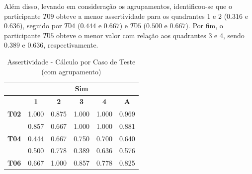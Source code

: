 Além disso, levando em consideração os agrupamentos, identificou-se que o participante $T09$ obteve a menor assertividade para os quadrantes 1 e 2 ($0.316$ e $0.636$), seguido por $T04$ ($0.444$ e $0.667$) e $T05$ ($0.500$ e $0.667$). Por fim, o participante $T05$ obteve o menor valor com relação aos quadrantes 3 e 4, sendo $0.389$ e $0.636$, respectivamente.

\begin{table}[htbp]
	\centering
	\caption{Assertividade - Cálculo por Caso de Teste (com agrupamento)}
	\begin{tabular}{|cccccc|}
		\hline
		\rowcolor[HTML]{D0CECE} 
		\multicolumn{1}{|c|}{\cellcolor[HTML]{F2F2F2}\textbf{Agrupamento}} & \multicolumn{5}{c|}{Sim} \\ \hline
		\rowcolor[HTML]{D0CECE} 
		\multicolumn{1}{|c|}{\cellcolor[HTML]{D0CECE}\textbf{Participante}} & \multicolumn{1}{c|}{\cellcolor[HTML]{D0CECE}\textbf{1}} & \multicolumn{1}{c|}{\cellcolor[HTML]{D0CECE}\textbf{2}} & \multicolumn{1}{c|}{\cellcolor[HTML]{D0CECE}\textbf{3}} & \multicolumn{1}{c|}{\cellcolor[HTML]{D0CECE}\textbf{4}} & \textbf{A} \\ \hline
		\multicolumn{1}{|c|}{\textbf{T02}} & \multicolumn{1}{c|}{1.000} & \multicolumn{1}{c|}{0.875} & \multicolumn{1}{c|}{1.000} & \multicolumn{1}{c|}{1.000} & 0.969 \\ \hline
		\rowcolor[HTML]{F2F2F2} 
		\multicolumn{1}{|c|}{\cellcolor[HTML]{F2F2F2}\textbf{T03}} & \multicolumn{1}{c|}{\cellcolor[HTML]{F2F2F2}0.857} & \multicolumn{1}{c|}{\cellcolor[HTML]{F2F2F2}0.667} & \multicolumn{1}{c|}{\cellcolor[HTML]{F2F2F2}1.000} & \multicolumn{1}{c|}{\cellcolor[HTML]{F2F2F2}1.000} & 0.881 \\ \hline
		\multicolumn{1}{|c|}{\textbf{T04}} & \multicolumn{1}{c|}{0.444} & \multicolumn{1}{c|}{0.667} & \multicolumn{1}{c|}{0.750} & \multicolumn{1}{c|}{0.700} & 0.640 \\ \hline
		\rowcolor[HTML]{F2F2F2} 
		\multicolumn{1}{|c|}{\cellcolor[HTML]{F2F2F2}\textbf{T05}} & \multicolumn{1}{c|}{\cellcolor[HTML]{F2F2F2}0.500} & \multicolumn{1}{c|}{\cellcolor[HTML]{F2F2F2}0.778} & \multicolumn{1}{c|}{\cellcolor[HTML]{F2F2F2}0.389} & \multicolumn{1}{c|}{\cellcolor[HTML]{F2F2F2}0.636} & 0.576 \\ \hline
		\multicolumn{1}{|c|}{\textbf{T06}} & \multicolumn{1}{c|}{0.667} & \multicolumn{1}{c|}{1.000} & \multicolumn{1}{c|}{0.857} & \multicolumn{1}{c|}{0.778} & 0.825 \\ \hline

\end{tabular}
\end{table}
